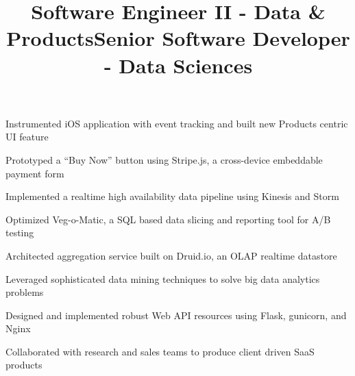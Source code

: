 \documentclass[12pt, tweaklist, line]{res}
\let\tempone\itemize
\let\temptwo\enditemize
\renewenvironment{itemize}{\tempone\vspace{-.15in}\setlength{\topsep}{0pt}\setlength{\itemsep}{3pt}\vspace{-.15in}}{\temptwo}
\def\Cplusplus{{\rm C\raise.5ex\hbox{\small ++}}}
\begin{document}
\begin{resume}
\title{Software Engineer II - Data \& Products}
\begin{position}
\begin{itemize}
\item Instrumented iOS application with event tracking and built new Products centric UI feature
\item Prototyped a ``Buy Now'' button using Stripe.js, a cross-device embeddable payment form
\item Implemented a realtime high availability data pipeline using Kinesis and Storm
\item Optimized Veg-o-Matic, a SQL based data slicing and reporting tool for A/B testing
\item Architected aggregation service built on Druid.io, an OLAP realtime datastore
\end{itemize}
\end{position}

\title{Senior Software Developer - Data Sciences}
\begin{position}
\begin{itemize}
\item Leveraged sophisticated data mining techniques to solve big data analytics problems
\item Designed and implemented robust Web API resources using Flask, gunicorn, and Nginx
\item Collaborated with research and sales teams to produce client driven SaaS products
\end{itemize}
\end{position}


\end{resume}
\end{document}
